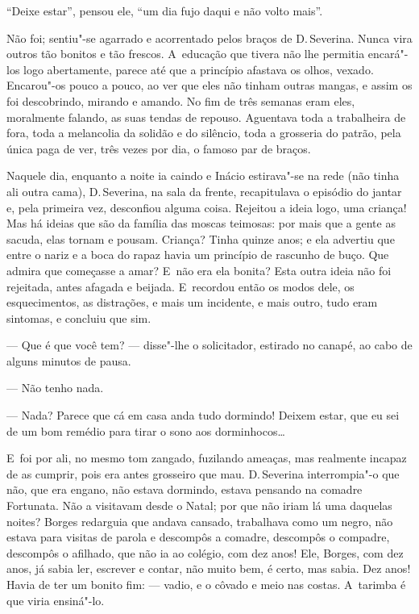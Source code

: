 \begin{linenumbers}
``Deixe estar'', pensou ele, ``um dia fujo daqui e não volto mais''.

Não foi; sentiu"-se agarrado e acorrentado pelos braços de D.\,Severina.
Nunca vira outros tão bonitos e tão frescos. A~educação que tivera não
lhe permitia encará"-los logo abertamente, parece até que a princípio
afastava os olhos, vexado. Encarou"-os pouco a pouco, ao ver que eles não
tinham outras mangas, e assim os foi descobrindo, mirando e amando. No
fim de três semanas eram eles, moralmente falando, as suas tendas de
repouso. Aguentava toda a trabalheira de fora, toda a melancolia da
solidão e do silêncio, toda a grosseria do patrão, pela única paga de
ver, três vezes por dia, o famoso par de braços.

Naquele dia, enquanto a noite ia caindo e Inácio estirava"-se na rede
(não tinha ali outra cama), D.\,Severina, na sala da frente, recapitulava
o episódio do jantar e, pela primeira vez, desconfiou alguma coisa.
Rejeitou a ideia logo, uma criança! Mas há ideias que são da família das
moscas teimosas: por mais que a gente as sacuda, elas tornam e pousam.
Criança? Tinha quinze anos; e ela advertiu que entre o nariz e a boca do
rapaz havia um princípio de rascunho de buço. Que admira que começasse a
amar? E~não era ela bonita? Esta outra ideia não foi rejeitada, antes
afagada e beijada. E~recordou então os modos dele, os esquecimentos, as
distrações, e mais um incidente, e mais outro, tudo eram sintomas, e
concluiu que sim.

--- Que é que você tem? --- disse"-lhe o solicitador, estirado no canapé,
ao cabo de alguns minutos de pausa.

--- Não tenho nada.

--- Nada? Parece que cá em casa anda tudo dormindo! Deixem estar, que eu
sei de um bom remédio para tirar o sono aos dorminhocos\ldots{}

E~foi por ali, no mesmo tom zangado, fuzilando ameaças, mas realmente
incapaz de as cumprir, pois era antes grosseiro que mau. D.\,Severina
interrompia"-o que não, que era engano, não estava dormindo, estava
pensando na comadre Fortunata. Não a visitavam desde o Natal; por que
não iriam lá uma daquelas noites? Borges redarguia que andava cansado,
trabalhava como um negro, não estava para visitas de parola e descompôs
a comadre, descompôs o compadre, descompôs o afilhado, que não ia ao
colégio, com dez anos! Ele, Borges, com dez anos, já sabia ler, escrever
e contar, não muito bem, é certo, mas sabia. Dez anos! Havia de ter um
bonito fim: --- vadio, e o côvado e meio nas costas. A~tarimba é que
viria ensiná"-lo.


\end{linenumbers}
